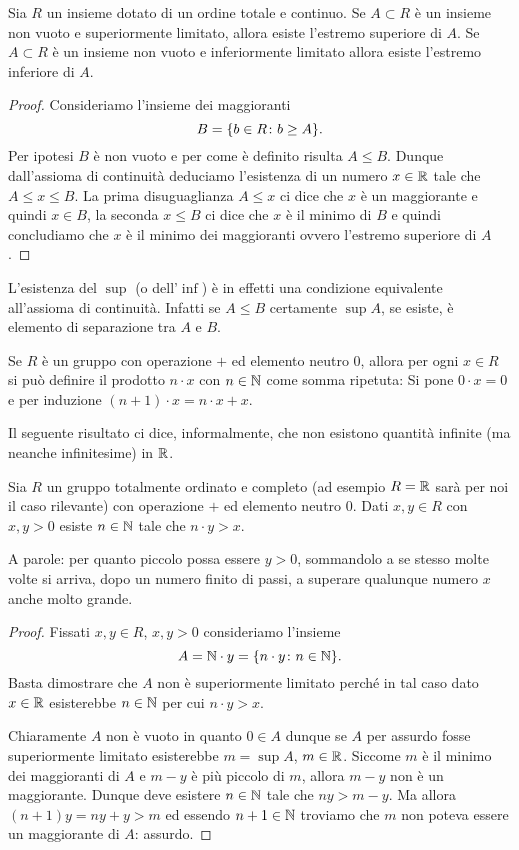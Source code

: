 \begin{theorem}%
  \label{th:sup}%
  \mymark{**}%
  Sia $R$ un insieme dotato di un ordine totale e continuo.
  Se $A\subset R$ è un insieme non vuoto
  e superiormente limitato, allora esiste l'estremo superiore di $A$.
  Se $A\subset R$ è un insieme non vuoto e inferiormente limitato 
  allora esiste l'estremo inferiore di $A$.
  \end{theorem}
  \begin{proof}
  \mymark{*}
  Consideriamo l'insieme dei maggioranti
  \[
  B = {\left\{  b\in R \colon b \ge A \right\}}.
  \]
  Per ipotesi $B$ è non vuoto e per come è definito risulta $A\le B$.
  Dunque dall'assioma di continuità deduciamo l'esistenza di un numero $x\in {\mathbb R}$
  tale che $A\le x \le B$. La prima disuguaglianza $A\le x$ ci dice che $x$ è un
  maggiorante e quindi $x\in B$, la seconda $x\le B$ ci dice che $x$ è il minimo
  di $B$ e quindi concludiamo che $x$ è il minimo dei maggioranti 
  ovvero l'estremo superiore di $A$.
\end{proof}

L'esistenza del $\sup$ (o dell'$\inf$)
è in effetti una condizione equivalente all'assioma di continuità.
Infatti se $A\le B$ certamente $\sup A$, se esiste, è elemento 
di separazione tra $A$ e $B$.

Se $R$ è un gruppo con operazione $+$ ed elemento neutro $0$, 
allora per ogni $x\in R$ si può definire 
il prodotto $n\cdot x$ con $n\in {\mathbb N}$ come somma ripetuta:
Si pone $0\cdot x=0$ e per induzione $(n+1)\cdot x= n\cdot x + x$.
 
Il seguente risultato ci dice, informalmente, che non 
esistono quantità infinite (ma neanche infinitesime) in ${\mathbb R}$.
%
\begin{theorem}
\label{th:archimede}%
\mymark{**}%
%
  Sia $R$ un gruppo totalmente ordinato e completo
  (ad esempio $R={\mathbb R}$ sarà per noi il caso rilevante)
  con operazione $+$ ed elemento neutro $0$.
  Dati $x,y\in R$ con $x,y>0$ esiste $n\in {\mathbb N}$ 
  tale che $n \cdot y > x$.

  A parole: per quanto piccolo possa essere $y>0$, 
  sommandolo a se stesso molte volte si arriva, 
  dopo un numero finito di passi, a superare 
  qualunque numero $x$ anche molto grande.
\end{theorem}
%
\begin{proof}
\mymark{*}
  Fissati $x,y\in R$, $x,y>0$ consideriamo l'insieme 
  \[
     A = {\mathbb N} \cdot y = {\left\{ n\cdot y\colon n\in {\mathbb N} \right\}}.
  \]
  Basta dimostrare che $A$ non è superiormente limitato perché 
  in tal caso dato $x\in {\mathbb R}$ esisterebbe $n\in {\mathbb N}$ per cui $n\cdot y> x$.

  Chiaramente $A$ non è vuoto in quanto $0\in A$ dunque se $A$ 
  per assurdo fosse superiormente limitato esisterebbe 
  $m=\sup A$, $m\in {\mathbb R}$. 
  Siccome $m$ è il minimo dei maggioranti di $A$
  e $m-y$ è più piccolo di $m$, allora $m-y$ non è un maggiorante. 
  Dunque deve esistere $n\in {\mathbb N}$ tale che $ny>m-y$.
  Ma allora $(n+1)y = ny + y > m$ ed essendo $n+1\in {\mathbb N}$ troviamo che $m$
  non poteva essere un maggiorante di $A$: assurdo.
\end{proof}


